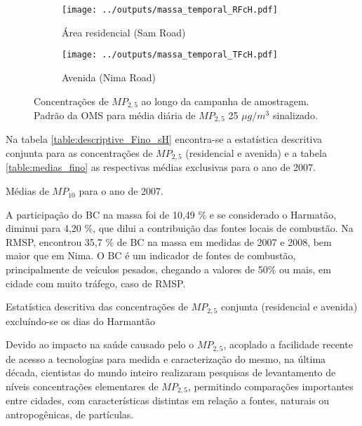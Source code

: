 \begin{figure}[H]
  \centering
  \begin{subfigure}[b]{0.45\textwidth}
    \texttt{[image: ../outputs/massa\_temporal\_RFcH.pdf]}
    \caption{Área residencial (Sam Road)}
  \end{subfigure}%
  \begin{subfigure}[b]{0.45\textwidth}
    \texttt{[image: ../outputs/massa\_temporal\_TFcH.pdf]}
    \caption{Avenida (Nima Road)}
  \end{subfigure}
  \caption{Concentrações de $MP_{2,5}$ ao longo da campanha de amostragem. 
           Padrão da OMS para média diária de $MP_{2,5}$ 25 $\mu g/m^3$ sinalizado.
           \label{fig:massa_temporal_mp2.5}}
\end{figure}

Na tabela \ref{table:descriptive_Fino_sH} encontra-se a estatística 
descritiva conjunta para as concentrações de $MP_{2,5}$ (residencial e avenida)
e a tabela \ref{table:medias_fino} as respectivas médias exclusivas para o ano
de 2007.

\begin{table}[H]
  \centering
  
  \caption{Médias de $MP_{10}$ para o ano de 2007. \label{table:medias_fino}}
\end{table} 

A participação do BC na massa foi de 10,49 \% e se considerado 
o Harmatão, diminui para 4,20 \%, que dilui a contribuição das fontes locais 
de combustão.
Na RMSP, \citet{andrade2012} encontrou 35,7 \% de BC na massa em medidas
de 2007 e 2008, bem maior que em Nima. O BC é um indicador de fontes de 
combustão, principalmente de veículos pesados, chegando a valores de 50\% ou 
mais, em cidade com muito tráfego, caso de RMSP.

\begin{table}[H]
  \centering
    
  \caption{Estatística descritiva das concentrações de $MP_{2,5}$ conjunta 
           (residencial e avenida) excluíndo-se os dias do Harmantão
            \label{table:descriptive_Fino_sH}}
\end{table}

Devido ao impacto na saúde causado pelo o $MP_{2,5}$, acoplado a facilidade 
recente de acesso a tecnologias para medida e caracterização do mesmo, 
na última década, cientistas do mundo inteiro realizaram pesquisas de 
levantamento de níveis concentrações elementares de $MP_{2,5}$, permitindo
comparações importantes entre cidades, com características distintas em 
relação a fontes, naturais ou antropogênicas, de partículas.


